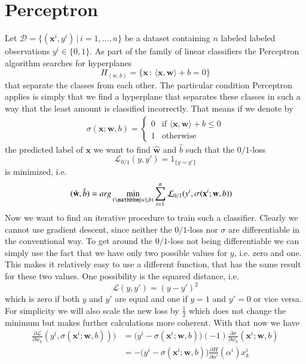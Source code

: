 \documentclass[preprint,12pt,3p]{elsarticle}
\begin{document}
\section{Perceptron}
Let $\mathcal{D}=\{(\mathbf{x}^i,y^i)\,|\,i=1,...,n\}$ be a dataset containing $n$ labeled labeled observations $y^i\in\{0,1\}$. As part of the family of linear classifiers the Perceptron algorithm searches for hyperplanes $$H_{(w,b)}=\{\mathbf{x}\,:\,\langle\mathbf{x},\mathbf{w}\rangle+b=0\}$$  
that separate the classes from each other. The particular condition Perceptron applies is simply that we find a hyperplane that separates these classes in such a way that the least amount is classified incorrectly. That means if we denote by 
\begin{align*}
    \sigma(\mathbf{x};\mathbf{w},b)=\begin{cases}0 &\mbox{if }\langle\mathbf{x},\mathbf{w}\rangle+b\leq0\\
    1&\mbox{otherwise}\end{cases}
\end{align*} 
the predicted label of $\mathbf{x}$ we want to find $\hat{\mathbf{w}}$ and $\hat{b}$ such that the $0/1$-loss 
$$\mathcal{L}_{0/1}(y,y')=1_{\{y=y'\}}$$ is minimized, i.e.
\begin{align*}
    (\hat{\mathbf{w}},\hat{b})&=arg\min_{(\mathbbm{w},b)}\sum_{i=1}^n\mathcal{L}_{0/1}(y^i,\sigma(\mathbf{x}^i;\mathbf{w},b))
\end{align*}
Now we want to find an iterative procedure to train such a classifier. Clearly we cannot use gradient descent, since neither the $0/1$-loss nor $\sigma$ are differentiable in the conventional way. To get around the $0/1$-loss not being differentiable we can simply use the fact that we have only two possible values for $y$, i.e. zero and one. This makes it relatively easy to use a different function, that has the same result for these two values. One possibility is the squared distance, i.e.
$$\mathcal{L}(y,y')=(y-y')^2$$ which is zero if both $y$ and $y'$ are equal and one if $y=1$ and $y'=0$ or vice versa. For simplicity we will also scale the new loss by $\frac{1}{2}$ which does not change the minimum but makes further calculations more coherent. With that now we have
\begin{align*}
    \frac{\partial\mathcal{L}}{\partial w_k}(y^i,\sigma(\mathbf{x}^i;\mathbf{w},b)))&=\big(y^i-\sigma(\mathbf{x}^i;\mathbf{w},b)\big)(-1)\frac{\partial\sigma}{\partial w_k}(\mathbf{x}^i;\mathbf{w},b)\\
    &=-\big(y^i-\sigma(\mathbf{x}^i;\mathbf{w},b)\big)\frac{\partial H}{\partial \alpha^i}(\alpha^i)x^i_k
\end{align*}
\end{document}
